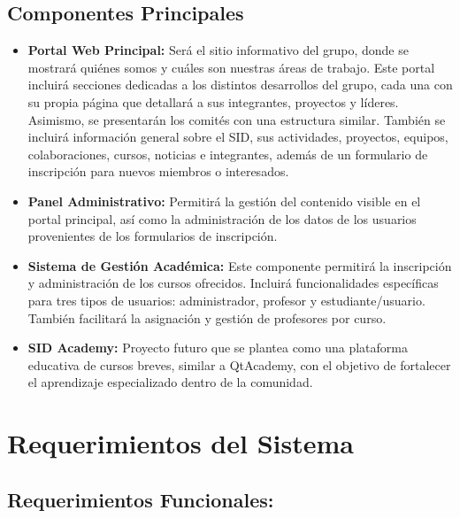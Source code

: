 \documentclass[11pt,a4paper]{article}
\begin{document}
\subsection{Componentes Principales}
\begin{itemize}
	\item \textbf{Portal Web Principal: } Será el sitio informativo del grupo,
	      donde se mostrará quiénes somos y cuáles son nuestras áreas de trabajo. Este portal incluirá secciones dedicadas a los distintos
	      desarrollos del grupo, cada una con su propia página que detallará a sus integrantes, proyectos y líderes. Asimismo, se presentarán los
	      comités con una estructura similar.
	      También se incluirá información general sobre el SID, sus actividades, proyectos, equipos, colaboraciones, cursos, noticias e integrantes,
	      además de un formulario de inscripción para nuevos miembros o interesados.

	\item \textbf{Panel Administrativo: } Permitirá la gestión del contenido visible en el portal principal, así como la administración de los datos de los usuarios provenientes de los formularios de inscripción.

	\item \textbf{Sistema de Gestión Académica: } Este componente permitirá la inscripción y administración de los cursos ofrecidos. Incluirá funcionalidades específicas para tres tipos de usuarios: administrador, profesor y estudiante/usuario. También facilitará la asignación y gestión de profesores por curso.

	\item \textbf{SID Academy: } Proyecto futuro que se plantea como una plataforma educativa de cursos breves, similar a QtAcademy, con el objetivo de fortalecer el aprendizaje especializado dentro de la comunidad.
\end{itemize}

\section{Requerimientos del Sistema}
\subsection{Requerimientos Funcionales: }
\end{document}
